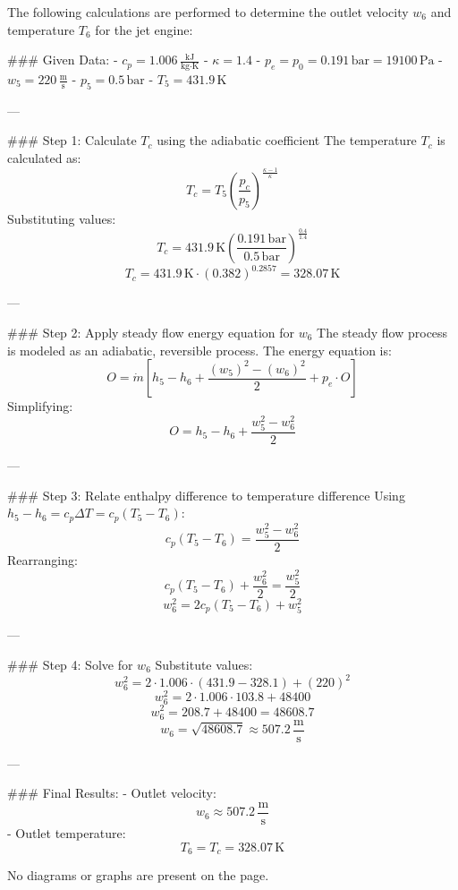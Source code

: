 The following calculations are performed to determine the outlet velocity \( w_6 \) and temperature \( T_6 \) for the jet engine:

### Given Data:
- \( c_p = 1.006 \, \frac{\text{kJ}}{\text{kg·K}} \)  
- \( \kappa = 1.4 \)  
- \( p_e = p_0 = 0.191 \, \text{bar} = 19100 \, \text{Pa} \)  
- \( w_5 = 220 \, \frac{\text{m}}{\text{s}} \)  
- \( p_5 = 0.5 \, \text{bar} \)  
- \( T_5 = 431.9 \, \text{K} \)  

---

### Step 1: Calculate \( T_c \) using the adiabatic coefficient  
The temperature \( T_c \) is calculated as:  
\[
T_c = T_5 \left( \frac{p_c}{p_5} \right)^{\frac{\kappa - 1}{\kappa}}
\]  
Substituting values:  
\[
T_c = 431.9 \, \text{K} \left( \frac{0.191 \, \text{bar}}{0.5 \, \text{bar}} \right)^{\frac{0.4}{1.4}}
\]  
\[
T_c = 431.9 \, \text{K} \cdot \left( 0.382 \right)^{0.2857} = 328.07 \, \text{K}
\]  

---

### Step 2: Apply steady flow energy equation for \( w_6 \)  
The steady flow process is modeled as an adiabatic, reversible process. The energy equation is:  
\[
O = \dot{m} \left[ h_5 - h_6 + \frac{(w_5)^2 - (w_6)^2}{2} + p_e \cdot O \right]
\]  
Simplifying:  
\[
O = h_5 - h_6 + \frac{w_5^2 - w_6^2}{2}
\]  

---

### Step 3: Relate enthalpy difference to temperature difference  
Using \( h_5 - h_6 = c_p \Delta T = c_p (T_5 - T_6) \):  
\[
c_p (T_5 - T_6) = \frac{w_5^2 - w_6^2}{2}
\]  
Rearranging:  
\[
c_p (T_5 - T_6) + \frac{w_6^2}{2} = \frac{w_5^2}{2}
\]  
\[
w_6^2 = 2 c_p (T_5 - T_6) + w_5^2
\]  

---

### Step 4: Solve for \( w_6 \)  
Substitute values:  
\[
w_6^2 = 2 \cdot 1.006 \cdot (431.9 - 328.1) + (220)^2
\]  
\[
w_6^2 = 2 \cdot 1.006 \cdot 103.8 + 48400
\]  
\[
w_6^2 = 208.7 + 48400 = 48608.7
\]  
\[
w_6 = \sqrt{48608.7} \approx 507.2 \, \frac{\text{m}}{\text{s}}
\]  

---

### Final Results:
- Outlet velocity:  
\[
w_6 \approx 507.2 \, \frac{\text{m}}{\text{s}}
\]  
- Outlet temperature:  
\[
T_6 = T_c = 328.07 \, \text{K}
\]  

No diagrams or graphs are present on the page.